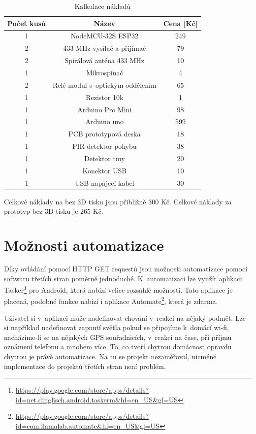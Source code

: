 \documentclass[11pt,a4paper,twoside,openright]{report}
\begin{document}
	\begin{table}[htb]
		\centering
		\begin{tabular}{|c|c|c|}
			\hline
			Počet kusů & Název & Cena [Kč] \\
			\hline
			1 & NodeMCU-32S ESP32 & 249  \\
			\hline
			2 & 433 MHz vysílač a přijímač & 79 \\
			\hline
			2 & Spirálová anténa 433 MHz & 10 \\
			\hline
			1 & Mikrospínač & 4 \\
			\hline
			2 & Relé modul s~optickým oddělením & 65 \\
			\hline
			1 & Rezistor 10k & 1 \\
			\hline
			1 & Arduino Pro Mini & 98 \\
			\hline
			1 & Arduino uno & 599 \\
			\hline
			1 & PCB prototypová deska & 18 \\
			\hline
			1 & PIR detektor pohybu & 38 \\
			\hline
			1 & Detektor tmy & 20 \\
			\hline
			1 & Konektor USB & 10 \\
			\hline
			1 & USB napájecí kabel & 30 \\
			\hline
		\end{tabular}
		\caption{Kalkulace nákladů}
	\end{table}
	
	Celkové náklady na  bez 3D tisku jsou přibližně 300 Kč.
	Celkové náklady za prototyp  bez 3D tisku je 265 Kč.
	
	
	\section{Možnosti automatizace}
	Díky ovládání pomocí HTTP GET requestů jsou možnosti automatizace pomocí softwaru třetích stran poměrně jednoduché. K~automatizaci lze využít aplikaci Tasker\footnote{\url{https://play.google.com/store/apps/details?id=net.dinglisch.android.taskerm&hl=en_US&gl=US}} pro Android, která nabízí velice rozsáhlé možnosti. Tato aplikace je placená, podobné funkce nabízí i aplikace Automate\footnote{\url{https://play.google.com/store/apps/details?id=com.llamalab.automate&hl=en_US&gl=US}}, která je zdarma. 
	
	
	Uživatel si v~aplikaci může nadefinovat chování  v~reakci na nějaký podmět. Lze si například nadefinovat zapnutí světla pokud se připojíme k~domácí wi-fi, nacházíme-li se na nějakých GPS souřadnicích, v~reakci na čase, při příjmu oznámení telefonu a mnohem více. To, co tvoří chytrou domácnost opravdu chytrou je právě automatizace. Na tu se projekt nezaměřoval, nicméně implementace do projektů třetích stran není problém.
	
\end{document}
